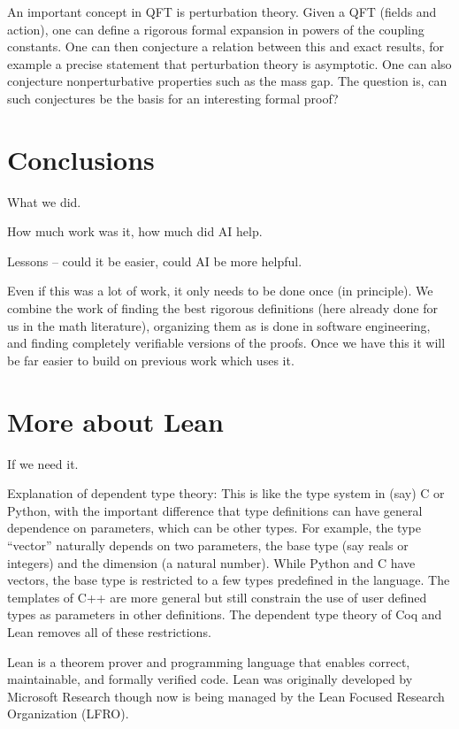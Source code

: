 \documentclass{article}
\newcommand{\1}{\mathbbm{1}}
\theoremstyle{plain}
\theoremstyle{definition}
\numberwithin{equation}{section}
\begin{document}
An important concept in QFT is perturbation theory.  Given a QFT (fields and action), one can define a rigorous formal expansion
in powers of the coupling constants.  One can then conjecture a relation between this and exact results, for example a precise statement
that perturbation theory is asymptotic.  One can also conjecture nonperturbative properties such as the mass gap.  The question is, can such
conjectures be the basis for an interesting formal proof?

\section{Conclusions}

What we did.

How much work was it, how much did AI help.

Lessons -- could it be easier, could AI be more helpful.

Even if this was a lot of work, it only needs to be done once (in principle).  We combine the work of finding the best
rigorous definitions (here already done for us in the math literature), organizing them as is done in software engineering,
and finding completely verifiable versions of the proofs.  Once we have this it will be far easier to build on previous work
which uses it.


\appendix

\section{More about Lean}

If we need it.

Explanation of dependent type theory:
This is like the type system in (say) C or Python, with the important difference that type definitions can have
general dependence on parameters, which can be other types.  
For example, the type ``vector'' naturally depends on two parameters, the base
type (say reals or integers) and the dimension (a natural number).  While Python and C have vectors, the base type
is restricted to a few types predefined in the language.  The templates of C++ are more general but still constrain
the use of user defined types as parameters in other definitions.  The dependent type theory of Coq and Lean
removes all of these restrictions.

Lean is a theorem prover and programming language that enables correct, maintainable, and formally verified code. Lean was originally developed by Microsoft Research though now is being managed by the Lean Focused Research Organization (LFRO). 
\end{document}
